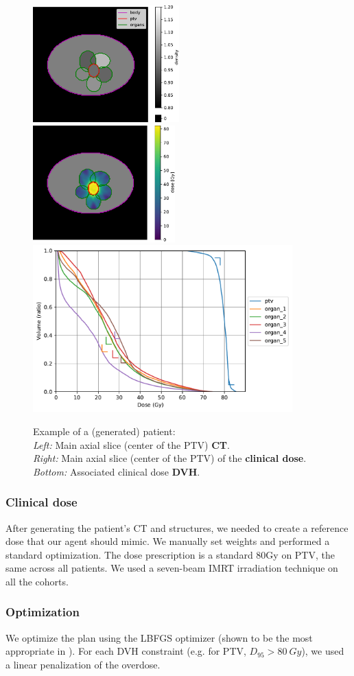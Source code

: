 \begin{figure}
	\centering
	\label{fig:main_slice-ct}	\includegraphics[height=4.5cm]{main_slice-ct.pdf}
	\hspace{0.5cm}
	\label{fig:main_slice-dose}
	\includegraphics[height=4.5cm]{main_slice-dose.pdf}
	\\
	\label{fig:clinical_dvh}
	\includegraphics[width=10cm]{dvh_example.pdf}
	\caption{
		Example of a (generated) patient: \\
		\textit{Left:} Main axial slice (center of the PTV) \textbf{CT}.\\
		\textit{Right:} Main axial slice (center of the PTV) of the \textbf{clinical dose}. \\
		\textit{Bottom:} Associated clinical dose \textbf{DVH}.
	}
	
\end{figure}

\subsubsection*{Clinical dose}
After generating the patient's CT and structures, we needed to create a reference dose that our agent should mimic.
We manually set weights and performed a standard optimization.
The dose prescription is a standard 80Gy on PTV, the same across all patients.
We used a seven-beam IMRT irradiation technique on all the cohorts.


\subsubsection*{Optimization}
We optimize the plan using the LBFGS optimizer (shown to be the most appropriate in \cite{dubois_radiotherapy_2023}).
For each DVH constraint (e.g. for PTV, $D_{95}>80 \ Gy$), we used a linear penalization of the overdose.
